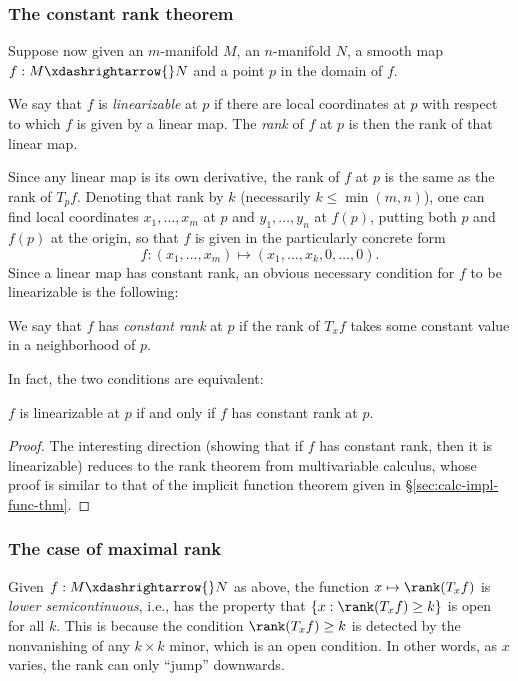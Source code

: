 \documentclass[reqno]{amsart} 
\begin{document}
\subsubsection{The constant rank theorem}
\label{sec:org52585b3}
Suppose now given an $m$-manifold $M$,
an $n$-manifold $N$,
a smooth map $f : M \xdashrightarrow{} N$
and a point $p$ in the domain of $f$.
\begin{definition}
  We say that $f$ is \emph{linearizable} at $p$
  if there are local coordinates at $p$ with respect
  to which $f$ is given by a linear map.
  The \emph{rank} of $f$ at $p$ is then the rank of that linear map.
\end{definition}
Since any linear  map is its own derivative,
the rank of $f$ at $p$ is the same as the rank of $T_p f$.
Denoting that rank by $k$
(necessarily $k \leq \min(m,n)$),
one can
find
local coordinates
$x_1,\dotsc,x_m$ at $p$ and $y_1,\dotsc,y_n$ at $f(p)$,
putting both $p$ and $f(p)$ at the origin,
so that $f$ is given in the particularly
concrete form
\begin{equation*}
  f : (x_1,\dotsc,x_m) \mapsto (x_1,\dotsc,x_k,0,\dotsc,0).
\end{equation*}
Since a linear map has constant rank, an obvious necessary condition for $f$
to be linearizable is the following:
\begin{definition}
  We say that $f$ has \emph{constant rank} at $p$
  if the rank of $T_x f$ takes some constant value
  in a neighborhood of $p$.
\end{definition}
In fact, the two conditions are equivalent:
\begin{theorem}\label{thm:constant-rank}
  $f$ is linearizable at $p$ if and only if $f$ has constant rank at $p$.
\end{theorem}
\begin{proof}
  The interesting direction (showing that if $f$ has constant
  rank, then it is linearizable) reduces to the rank theorem
  from multivariable calculus, whose proof is similar to that of
  the implicit function theorem given in
  \S\ref{sec:calc-impl-func-thm}.
\end{proof}

\subsubsection{The case of maximal rank\label{sec:linearization-subimm}}
\label{sec:org6479c62}
Given $f : M \xdashrightarrow{} N$ as above, the function
$x \mapsto \rank(T_x f)$ is \emph{lower semicontinuous}, i.e.,
has the property that $\{x : \rank(T_x f) \geq k\}$ is open for
all $k$.  This is because the condition $\rank(T_x f) \geq k$ is
detected by the nonvanishing of any $k \times k$ minor, which is
an open condition.  In other words, as $x$ varies, the rank can
only ``jump'' downwards.
\end{document}
